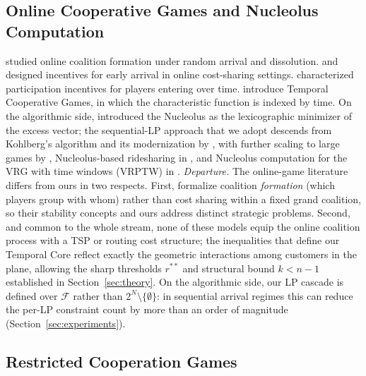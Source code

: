 \documentclass[11pt]{article}
\theoremstyle{plain}
\theoremstyle{definition}
\theoremstyle{remark}
\newcommand{\F}{\mathcal{F}}
\begin{document}
\subsection{Online Cooperative Games and Nucleolus Computation}
\citet{bullinger2023online} studied online coalition formation under random arrival and dissolution. \citet{ge2024incentives} and \citet{zhang2025incentives} designed incentives for early arrival in online cost-sharing settings. \citet{aziz2025participation} characterized participation incentives for players entering over time. \citet{goyal2025temporal} introduce Temporal Cooperative Games, in which the characteristic function is indexed by time. On the algorithmic side, \citet{schmeidler1969nucleolus} introduced the Nucleolus as the lexicographic minimizer of the excess vector; the sequential-LP approach that we adopt descends from Kohlberg's algorithm and its modernization by \citet{guajardo2015nucleolus}, with further scaling to large games by \citet{nguyen2016large}, Nucleolus-based ridesharing in \citet{lu2019ridesharing}, and Nucleolus computation for the VRG with time windows (VRPTW) in \citet{tae2020vrgtw}. \emph{Departure.} The online-game literature differs from ours in two respects. First, \citet{bullinger2023online} formalize coalition \emph{formation} (which players group with whom) rather than cost sharing within a fixed grand coalition, so their stability concepts and ours address distinct strategic problems. Second, and common to the whole stream, none of these models equip the online coalition process with a TSP or routing cost structure; the inequalities that define our Temporal Core reflect exactly the geometric interactions among customers in the plane, allowing the sharp thresholds $r^{\ast\ast}$ and structural bound $k<n-1$ established in Section~\ref{sec:theory}. On the algorithmic side, our LP cascade is defined over $\F$ rather than $2^N\setminus\{\emptyset\}$: in sequential arrival regimes this can reduce the per-LP constraint count by more than an order of magnitude (Section~\ref{sec:experiments}).

\subsection{Restricted Cooperation Games}
\end{document}
